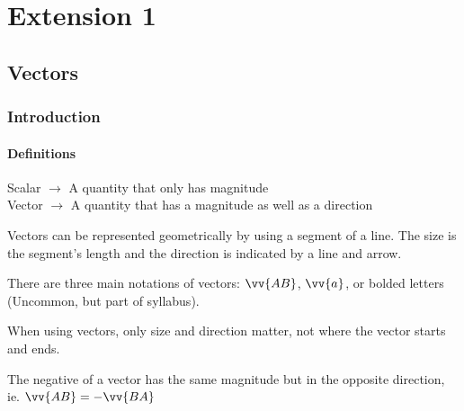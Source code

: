 
\chapter{Extension 1}
\section{Vectors}
\subsection{Introduction}
\subsubsection{Definitions}
Scalar $\rightarrow$ A quantity that only has magnitude \\
Vector $\rightarrow$ A quantity that has a magnitude as well as a direction

Vectors can be represented geometrically by using a segment of a line. The size is the segment's length and the direction is indicated by a line and arrow.

There are three main notations of vectors: $\vv{AB}$, $\vv{a}$, or bolded letters (Uncommon, but part of syllabus).

When using vectors, only size and direction matter, not where the vector starts and ends.

The negative of a vector has the same magnitude but in the opposite direction, ie. $\vv{AB} = -\vv{BA}$